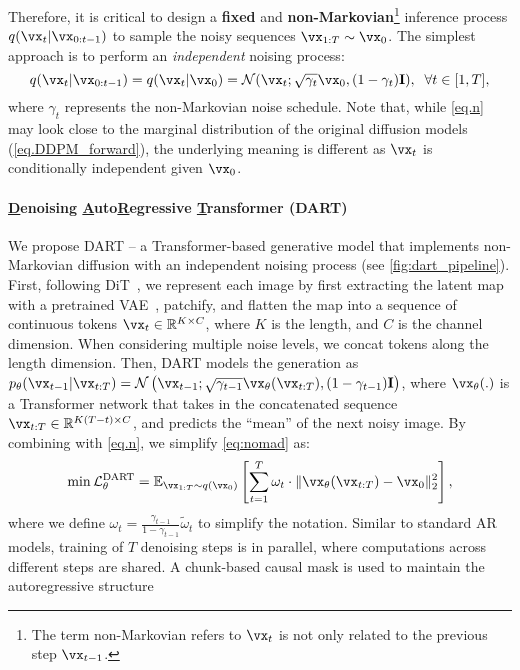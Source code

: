 Therefore, it is critical to design a \textbf{fixed} and \textbf{non-Markovian}\footnote{The term non-Markovian refers to $\vx_t$ is not only related to the previous step $\vx_{t-1}$.} inference process $q(\vx_t|\vx_{0:t-1})$ to sample the noisy sequences $\vx_{1:T}\sim \vx_0$.
The simplest approach is to perform an \textit{independent} noising process:
\begin{equation}
    q(\vx_t|\vx_{0:t-1}) = q(\vx_t|\vx_0) = \mathcal{N}(\vx_t; \sqrt{\gamma_t} \vx_0, (1-\gamma_t)\mathbf{I}), \;\; \forall t \in [1, T],
    \label{eq.n}
\end{equation}
where $\gamma_t$ represents the non-Markovian noise schedule. 
Note that, while \cref{eq.n} may look close to the marginal distribution of the original diffusion models (\cref{eq.DDPM_forward}), the underlying meaning is different as $\vx_t$ is conditionally independent given $\vx_0$.



\paragraph{\underline{D}enoising \underline{A}uto\underline{R}egressive \underline{T}ransformer (DART)}
We propose DART -- a Transformer-based generative model that implements non-Markovian diffusion with an independent noising process (see \cref{fig:dart_pipeline}). 
First, following DiT~\citep{peebles2022scalable}, we represent each image by first extracting the latent map with a pretrained VAE~\citep{rombach2021highresolution}, patchify, and flatten the map into a sequence of continuous tokens $\vx_t\in \mathbb{R}^{K\times C}$, where $K$ is the length, and $C$ is the channel dimension. When considering multiple noise levels,  we concat tokens along the length dimension. 
Then, DART models the generation as $p_\theta(\vx_{t-1}|\vx_{t:T}) = \mathcal{N}\left(\vx_{t-1}; \sqrt{\gamma_{t-1}}\vx_\theta(\vx_{t:T}), (1-\gamma_{t-1})\mathbf{I}\right)$, where $\vx_\theta(.)$ is a Transformer network that takes in the concatenated sequence $\vx_{t:T} \in \mathbb{R}^{K(T-t)\times C}$, and predicts the ``mean'' of the next noisy image. By combining with \cref{eq.n}, we simplify \cref{eq:nomad} as:
\begin{equation}
    \min \mathcal{L}^{\textrm{DART}}_\theta = \mathbb{E}_{\vx_{1:T}\sim q(\vx_0)}\left[
        \sum_{t=1}^T\omega_t\cdot\|\vx_\theta(\vx_{t:T}) - \vx_0\|^2_2
    \right],
    \label{eq.dart}
\end{equation}
where we define $\omega_t = \frac{\gamma_{t-1}}{1-\gamma_{t-1}} \tilde{\omega}_t$ to simplify the notation. Similar to standard AR models, training of $T$ denoising steps is in parallel, where computations across different steps are shared. A chunk-based causal mask is used to maintain the autoregressive structure



